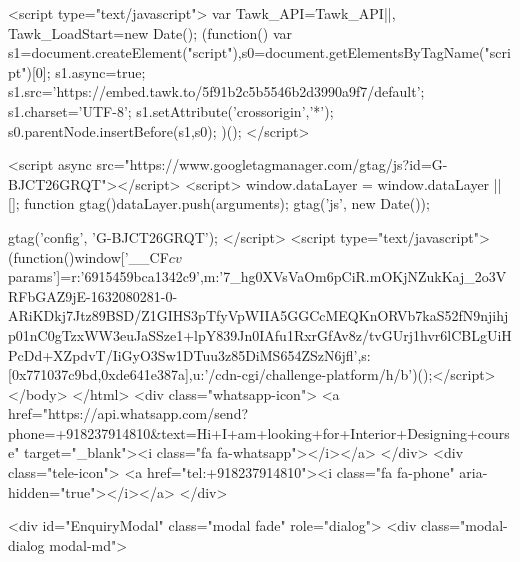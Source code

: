 {{{{{{{<script type="text/javascript">
var Tawk_API=Tawk_API||{}, Tawk_LoadStart=new Date();
(function(){
var s1=document.createElement("script"),s0=document.getElementsByTagName("script")[0];
s1.async=true;
s1.src='https://embed.tawk.to/5f91b2c5b5546b2d3990a9f7/default';
s1.charset='UTF-8';
s1.setAttribute('crossorigin','*');
s0.parentNode.insertBefore(s1,s0);
})();
</script>


<script async src="https://www.googletagmanager.com/gtag/js?id=G-BJCT26GRQT"></script>
<script>
  window.dataLayer = window.dataLayer || [];
  function gtag(){dataLayer.push(arguments);}
  gtag('js', new Date());

  gtag('config', 'G-BJCT26GRQT');
</script>
<script type="text/javascript">(function(){window['__CF$cv$params']={r:'6915459bca1342c9',m:'7_hg0XVsVaOm6pCiR.mOKjNZukKaj_2o3VRFbGAZ9jE-1632080281-0-ARiKDkj7Jtz89BSD/Z1GIHS3pTfyVpWIIA5GGCcMEQKnORVb7kaS52fN9njihjp01nC0gTzxWW3euJaSSze1+lpY839Jn0IAfu1RxrGfAv8z/tvGUrj1hvr6lCBLgUiHPcDd+XZpdvT/IiGyO3Sw1DTuu3z85DiMS654ZSzN6jfl',s:[0x771037c9bd,0xde641e387a],u:'/cdn-cgi/challenge-platform/h/b'}})();</script></body>
</html>
<div class="whatsapp-icon">
<a href="https://api.whatsapp.com/send?phone=+918237914810&text=Hi+I+am+looking+for+Interior+Designing+course" target="_blank"><i class="fa fa-whatsapp"></i></a>
</div>
<div class="tele-icon">
<a href="tel:+918237914810"><i class="fa fa-phone" aria-hidden="true"></i></a>
</div>

<div id="EnquiryModal" class="modal fade" role="dialog">
<div class="modal-dialog modal-md">

}}}}}}}
